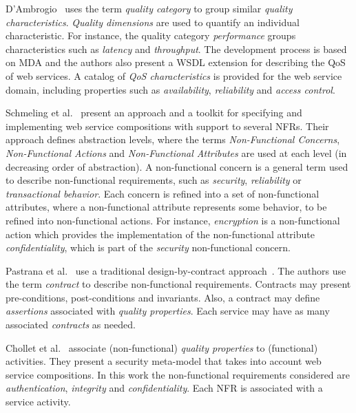 \documentclass[12pt,twoside]{article}
\theoremstyle{plain}
\theoremstyle{plain}
\begin{document}
\begin{multicols}{2}
D'Ambrogio~\cite{DAmbrogio06} uses the term \textit{quality category} to group similar \textit{quality characteristics}.
\textit{Quality dimensions} are used to quantify an individual characteristic.
For instance, the quality category \textit{performance} groups characteristics such as
\textit{latency} and \textit{throughput}.
The development process is based on MDA and the authors also present a WSDL extension for describing the QoS of web services. A catalog of \textit{QoS characteristics} is provided for the web service domain, including properties such as \textit{availability}, \textit{reliability} and \textit{access control}.


Schmeling et al.~\cite{SchmelingCM11} present an approach and a toolkit for specifying and implementing web service compositions with support to several NFRs.
Their approach defines abstraction levels, where the terms \textit{Non-Functional Concerns}, \textit{Non-Functional Actions} and \textit{Non-Functional Attributes} are used at each level (in decreasing order of abstraction).
A non-func\-tion\-al concern is a general term used to describe non-functional requirements, such as  \textit{security}, \textit{reliability} or \textit{transactional behavior}.
Each  concern is refined into a set of non-func\-tion\-al  at\-tri\-butes, where
a non-func\-tion\-al at\-tri\-bute represents some behavior, to be refined into non-functional actions.
For instance, \textit{encryption} is a non-func\-tion\-al  action  which provides the implementation of the non-functional attribute \textit{confidentiality}, which is part of the \textit{security} non-functional concern.

Pastrana et al.~\cite{PastranaPK11} use a traditional design-by-contract approach~\cite{Meyer97}.
The authors use the term \textit{contract} to describe non-functional re\-quire\-ments.
Contracts may present pre-con\-di\-tions, post-conditions and invariants.
Also, a con\-tract may define \textit{assertions} associated with \textit{qual\-i\-ty properties}.
Each service may have as many associated \textit{contracts} as needed.

Chollet et al.~\cite{CholletL09} associate (non-func\-tion\-al) \textit{quality properties} to
(functional) activities.
They present a security meta-model that takes into account web service compositions.
In this work the non-functional requirements considered are  \textit{authentication}, \textit{integrity} and \textit{confidentiality}.
Each NFR is associated with a service activity.



\end{multicols}
\end{document}
